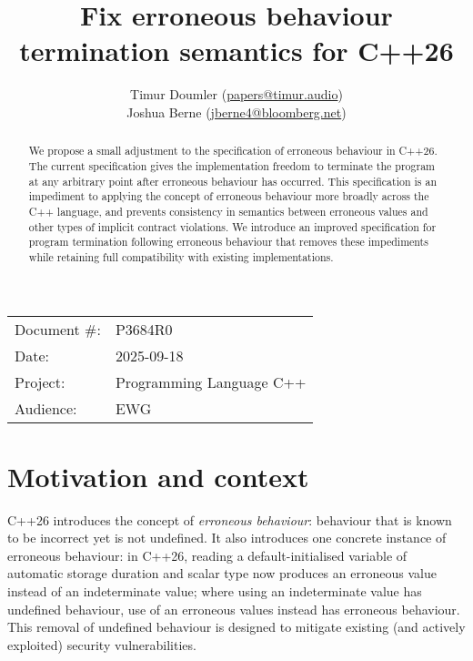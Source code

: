 

 \usepackage[bottom]{footmisc} 



\title{Fix erroneous behaviour termination semantics for C++26}
\author{
  Timur Doumler \small(\href{mailto:papers@timur.audio}{papers@timur.audio}) \\
  Joshua Berne \small(\href{mailto:jberne4@bloomberg.net}{jberne4@bloomberg.net}) 
}
\date{}
\maketitle

\begin{tabular}{ll}
Document \#: & P3684R0 \\
Date: &2025-09-18 \\
Project: & Programming Language C++ \\
Audience: & EWG
\end{tabular}

\begin{abstract}
We propose a small adjustment to the specification of erroneous behaviour in C++26. The current specification gives the implementation  freedom to terminate the program at any arbitrary point after erroneous behaviour has occurred. This specification is an impediment to applying the concept of erroneous behaviour more broadly across the C++ language, and prevents consistency in semantics between erroneous values and other types of implicit contract violations. We introduce an improved specification for program termination following erroneous behaviour that removes these impediments while retaining full compatibility with existing implementations.
\end{abstract}


\section{Motivation and context}

C++26 introduces the concept of \emph{erroneous behaviour}: behaviour that is known to be incorrect yet is not undefined. It also introduces one concrete instance of erroneous behaviour: in C++26, reading a default-initialised variable of automatic storage duration and scalar type now produces an erroneous value instead of an indeterminate value; where using an indeterminate value has undefined behaviour, use of an erroneous values instead has erroneous behaviour. This removal of undefined behaviour is designed to mitigate existing (and actively exploited) security vulnerabilities.

